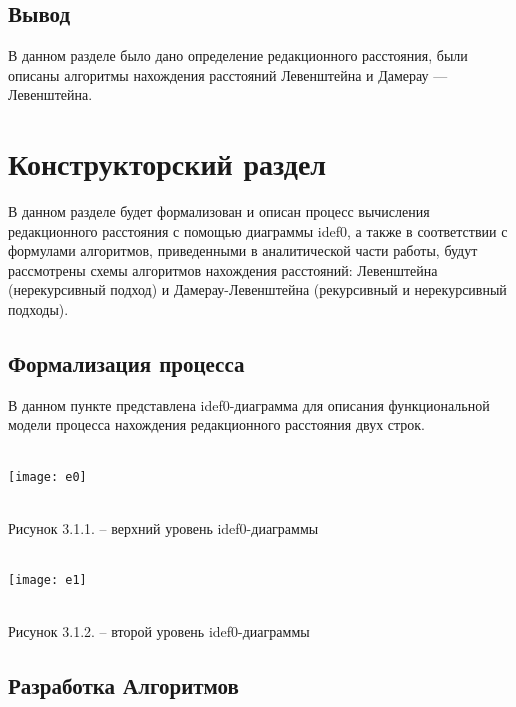 \documentclass[a4paper, 14pt]{article}
\begin{document}
	\subsection{Вывод}
	
	В данном разделе было дано определение редакционного расстояния, были описаны алгоритмы нахождения расстояний Левенштейна и Дамерау — Левенштейна.
	
	\newpage
	
	\section{Конструкторский раздел}
	
	В данном разделе будет формализован и описан процесс вычисления редакционного расстояния с помощью диаграммы idef0, а также в соответствии с формулами алгоритмов, приведенными в аналитической части работы, будут рассмотрены схемы алгоритмов нахождения расстояний: Левенштейна (нерекурсивный подход) и Дамерау-Левенштейна (рекурсивный и нерекурсивный подходы).
	
	\subsection{Формализация процесса}
	
	В данном пункте представлена idef0-диаграмма для описания функциональной модели процесса нахождения редакционного расстояния двух строк. \\\\
	
	\begin{minipage}{10cm}
	\texttt{[image: e0]}
	\end{minipage} \\
	
	\small Рисунок 3.1.1. – верхний уровень idef0-диаграммы \normalsize \\\\

	\begin{minipage}{10cm}
		\texttt{[image: e1]}
	\end{minipage} \\

	\small Рисунок 3.1.2. – второй уровень idef0-диаграммы \normalsize 

	
	\subsection{Разработка Алгоритмов}
	
\end{document}
